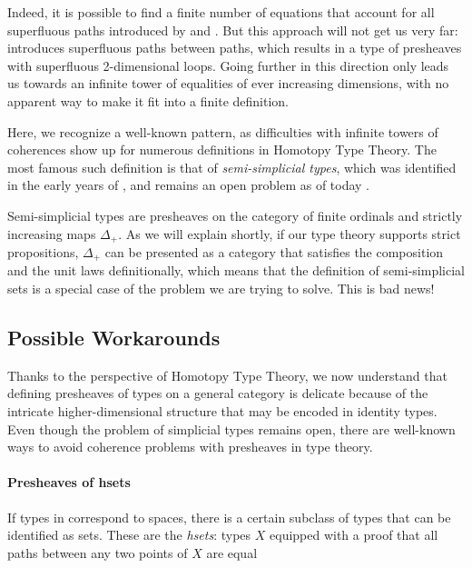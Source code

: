 Indeed, it is possible to find a finite number of equations that account for 
all superfluous paths introduced by  and .  
But this approach will not get us very far: 
% 
 introduces superfluous paths between paths, which results in
a type of presheaves with superfluous 2-dimensional loops.
% 
Going further in this direction only leads us towards an infinite tower 
of equalities of ever increasing dimensions, with no apparent way to make it 
fit into a finite definition.

Here, we recognize a well-known pattern, as difficulties with infinite 
towers of coherences show up for numerous definitions in Homotopy Type Theory.
% 
The most famous such definition is that of \emph{semi-simplicial types}, 
which was identified in the early years of \HoTT \cite{IAS2012semisimplicial}, 
and remains an open problem as of today .

Semi-simplicial types are presheaves on the category of finite ordinals and 
strictly increasing maps \( \Delta_+ \).
% 
As we will explain shortly, if our type theory supports strict propositions,
\( \Delta_+ \) can be presented as a category that satisfies the composition
and the unit laws definitionally, which means that the definition of 
semi-simplicial sets is a special case of the problem we are trying to solve.
% 
This is bad news!

\subsection{Possible Workarounds}

Thanks to the perspective of Homotopy Type Theory, we now understand that
defining presheaves of types on a general category is delicate because of the 
intricate higher-dimensional structure that may be encoded in identity types.
% 
Even though the problem of simplicial types remains open, there are well-known 
ways to avoid coherence problems with presheaves in type theory.

\paragraph{Presheaves of hsets} If types in \HoTT correspond to spaces, there 
is a certain subclass of types that can be identified as sets.
% 
These are the \emph{hsets}: types \( X \) equipped with a proof that all 
paths between any two points of \( X \) are equal


